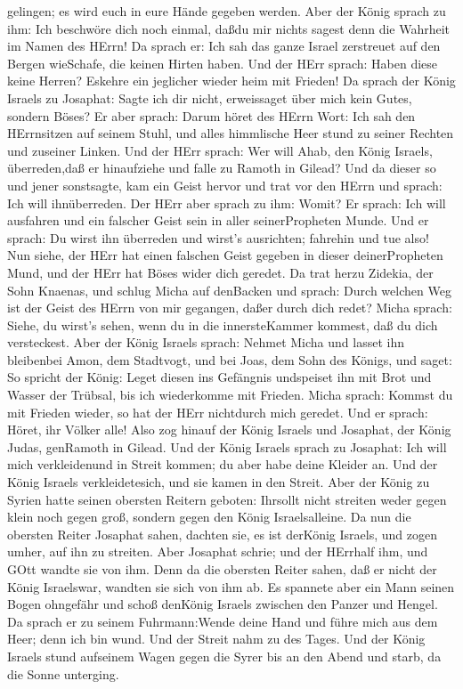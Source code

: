 gelingen; es wird euch in eure Hände gegeben werden.  Aber
der König sprach zu ihm: Ich beschwöre dich noch einmal, daßdu mir
nichts sagest denn die Wahrheit im Namen des HErrn!  Da
sprach er: Ich sah das ganze Israel zerstreuet auf den Bergen wieSchafe,
die keinen Hirten haben. Und der HErr sprach: Haben diese keine Herren?
Eskehre ein jeglicher wieder heim mit Frieden!  Da sprach
der König Israels zu Josaphat: Sagte ich dir nicht, erweissaget über
mich kein Gutes, sondern Böses?  Er aber sprach: Darum
höret des HErrn Wort: Ich sah den HErrnsitzen auf seinem Stuhl, und
alles himmlische Heer stund zu seiner Rechten und zuseiner Linken.
 Und der HErr sprach: Wer will Ahab, den König Israels,
überreden,daß er hinaufziehe und falle zu Ramoth in Gilead? Und da
dieser so und jener sonstsagte,  kam ein Geist hervor und
trat vor den HErrn und sprach: Ich will ihnüberreden. Der HErr aber
sprach zu ihm: Womit?  Er sprach: Ich will ausfahren und
ein falscher Geist sein in aller seinerPropheten Munde. Und er sprach:
Du wirst ihn überreden und wirst's ausrichten; fahrehin und tue also!
 Nun siehe, der HErr hat einen falschen Geist gegeben in
dieser deinerPropheten Mund, und der HErr hat Böses wider dich geredet.
 Da trat herzu Zidekia, der Sohn Knaenas, und schlug Micha
auf denBacken und sprach: Durch welchen Weg ist der Geist des HErrn von
mir gegangen, daßer durch dich redet?  Micha sprach: Siehe,
du wirst's sehen, wenn du in die innersteKammer kommest, daß du dich
versteckest.  Aber der König Israels sprach: Nehmet Micha
und lasset ihn bleibenbei Amon, dem Stadtvogt, und bei Joas, dem Sohn
des Königs,  und saget: So spricht der König: Leget diesen
ins Gefängnis undspeiset ihn mit Brot und Wasser der Trübsal, bis ich
wiederkomme mit Frieden.  Micha sprach: Kommst du mit
Frieden wieder, so hat der HErr nichtdurch mich geredet. Und er sprach:
Höret, ihr Völker alle!  Also zog hinauf der König Israels
und Josaphat, der König Judas, genRamoth in Gilead.  Und
der König Israels sprach zu Josaphat: Ich will mich verkleidenund in
Streit kommen; du aber habe deine Kleider an. Und der König Israels
verkleidetesich, und sie kamen in den Streit.  Aber der
König zu Syrien hatte seinen obersten Reitern geboten: Ihrsollt nicht
streiten weder gegen klein noch gegen groß, sondern gegen den König
Israelsalleine.  Da nun die obersten Reiter Josaphat sahen,
dachten sie, es ist derKönig Israels, und zogen umher, auf ihn zu
streiten. Aber Josaphat schrie; und der HErrhalf ihm, und GOtt wandte
sie von ihm.  Denn da die obersten Reiter sahen, daß er
nicht der König Israelswar, wandten sie sich von ihm ab. 
Es spannete aber ein Mann seinen Bogen ohngefähr und schoß denKönig
Israels zwischen den Panzer und Hengel. Da sprach er zu seinem
Fuhrmann:Wende deine Hand und führe mich aus dem Heer; denn ich bin
wund.  Und der Streit nahm zu des Tages. Und der König
Israels stund aufseinem Wagen gegen die Syrer bis an den Abend und
starb, da die Sonne unterging.

